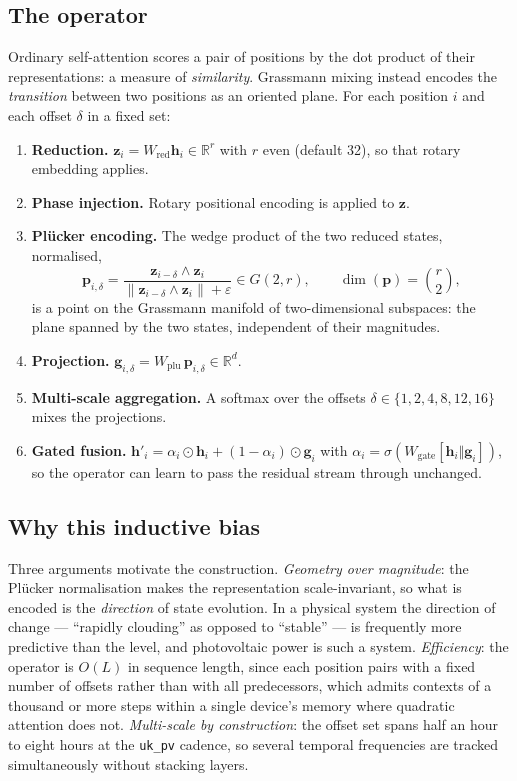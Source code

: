 \subsection{The operator}

Ordinary self-attention scores a pair of positions by the dot product of their
representations: a measure of \emph{similarity}. Grassmann mixing instead encodes the
\emph{transition} between two positions as an oriented plane. For each position $i$ and each
offset $\delta$ in a fixed set:

\begin{enumerate}
  \item \textbf{Reduction.} $\mathbf{z}_i = W_{\text{red}} \mathbf{h}_i \in \mathbb{R}^r$
    with $r$ even (default 32), so that rotary embedding applies.
  \item \textbf{Phase injection.} Rotary positional encoding is applied to $\mathbf{z}$.
  \item \textbf{Pl\"ucker encoding.} The wedge product of the two reduced states, normalised,
    \[
      \mathbf{p}_{i,\delta}
        = \frac{\mathbf{z}_{i-\delta} \wedge \mathbf{z}_i}
               {\lVert \mathbf{z}_{i-\delta} \wedge \mathbf{z}_i \rVert + \varepsilon}
        \in G(2, r),
      \qquad \dim(\mathbf{p}) = \binom{r}{2},
    \]
    is a point on the Grassmann manifold of two-dimensional subspaces: the plane spanned by
    the two states, independent of their magnitudes.
  \item \textbf{Projection.} $\mathbf{g}_{i,\delta} = W_{\text{plu}}\,\mathbf{p}_{i,\delta}
    \in \mathbb{R}^{d}$.
  \item \textbf{Multi-scale aggregation.} A softmax over the offsets
    $\delta \in \{1,2,4,8,12,16\}$ mixes the projections.
  \item \textbf{Gated fusion.} $\mathbf{h}'_i = \alpha_i \odot \mathbf{h}_i +
    (1-\alpha_i) \odot \mathbf{g}_i$ with
    $\alpha_i = \sigma\!\left(W_{\text{gate}}[\mathbf{h}_i \Vert \mathbf{g}_i]\right)$,
    so the operator can learn to pass the residual stream through unchanged.
\end{enumerate}

\subsection{Why this inductive bias}

Three arguments motivate the construction. \emph{Geometry over magnitude}: the Pl\"ucker
normalisation makes the representation scale-invariant, so what is encoded is the
\emph{direction} of state evolution. In a physical system the direction of change ---
``rapidly clouding'' as opposed to ``stable'' --- is frequently more predictive than the
level, and photovoltaic power is such a system. \emph{Efficiency}: the operator is $O(L)$ in
sequence length, since each position pairs with a fixed number of offsets rather than with
all predecessors, which admits contexts of a thousand or more steps within a single device's
memory where quadratic attention does not. \emph{Multi-scale by construction}: the offset set
spans half an hour to eight hours at the \texttt{uk\_pv} cadence, so several temporal
frequencies are tracked simultaneously without stacking layers.

